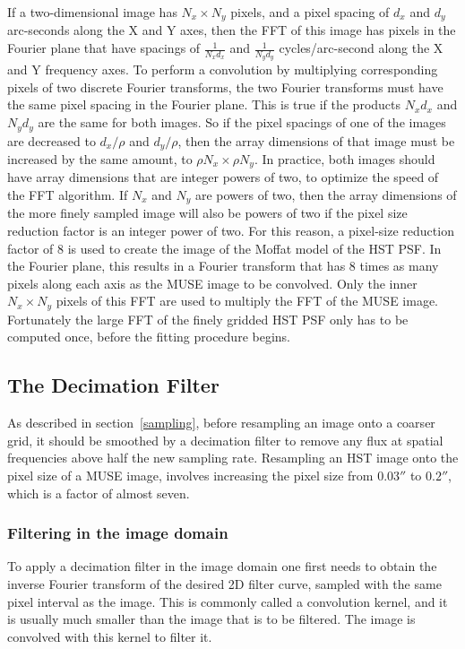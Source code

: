 \documentclass[12pt,twoside,a4paper]{article}
\newcommand{\arcsec}{''}
\begin{document}
If a two-dimensional image has $N_x \times N_y$ pixels, and a pixel
spacing of $d_x$ and $d_y$ arc-seconds along the X and Y axes, then
the FFT of this image has pixels in the Fourier plane that have
spacings of $\frac{1}{N_x d_x}$ and $\frac{1}{N_y d_y}$
cycles/arc-second along the X and Y frequency axes. To perform a
convolution by multiplying corresponding pixels of two discrete
Fourier transforms, the two Fourier transforms must have the same
pixel spacing in the Fourier plane. This is true if the products $N_x
d_x$ and $N_y d_y$ are the same for both images. So if the pixel
spacings of one of the images are decreased to $d_x/\rho$ and
$d_y/\rho$, then the array dimensions of that image must be increased
by the same amount, to $\rho N_x \times \rho N_y$. In practice, both
images should have array dimensions that are integer powers of two, to
optimize the speed of the FFT algorithm. If $N_x$ and $N_y$ are powers
of two, then the array dimensions of the more finely sampled image
will also be powers of two if the pixel size reduction factor is an
integer power of two. For this reason, a pixel-size reduction factor
of 8 is used to create the image of the Moffat model of the HST
PSF. In the Fourier plane, this results in a Fourier transform that
has 8 times as many pixels along each axis as the MUSE image to be
convolved. Only the inner $N_x \times N_y$ pixels of this FFT are used
to multiply the FFT of the MUSE image. Fortunately the large FFT of
the finely gridded HST PSF only has to be computed once, before the
fitting procedure begins.

\subsection{The Decimation Filter}

As described in section~\ref{sampling}, before resampling an image
onto a coarser grid, it should be smoothed by a decimation filter to
remove any flux at spatial frequencies above half the new sampling
rate. Resampling an HST image onto the pixel size of a MUSE image,
involves increasing the pixel size from $0.03\arcsec$ to $0.2\arcsec$,
which is a factor of almost seven.

\subsubsection{Filtering in the image domain}

To apply a decimation filter in the image domain one first needs to
obtain the inverse Fourier transform of the desired 2D filter curve,
sampled with the same pixel interval as the image. This is commonly
called a convolution kernel, and it is usually much smaller than the
image that is to be filtered. The image is convolved with this kernel
to filter it.
\end{document}
